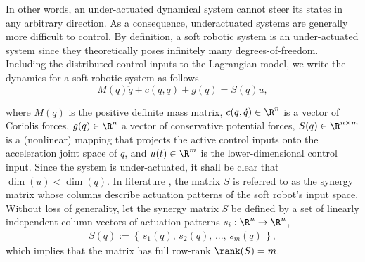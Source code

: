 \noindent In other words, an under-actuated dynamical system cannot steer its states in any arbitrary direction. As a consequence, underactuated systems are generally more difficult to control. By definition, a soft robotic system is an under-actuated system since they theoretically poses infinitely many degrees-of-freedom. Including the distributed control inputs to the Lagrangian model, we write the dynamics for a soft robotic system as follows
\begin{equation}
M(q)\ddot{q} + c(q,\dot{q}) + g(q)= S(q) u,
\end{equation}

\noindent where $M(q)$ is the positive definite mass matrix, $c(q,\dot{q})\in \R^{n}$ is a vector of Coriolis forces, $g(q)\in \R^{n}$ a vector of conservative potential forces, $S(q) \in \R^{n\times m}$ is a (nonlinear) mapping that projects the active control inputs onto the acceleration joint space of ${q}$, and $u(t) \in \R^{m}$ is the lower-dimensional control input. Since the system is under-actuated, it shall be clear that $\dim(u) < \dim(q)$. In literature \cite{Santina2019}, the matrix $S$ is referred to as the synergy matrix whose columns describe actuation patterns of the soft robot's input space. Without loss of generality, let the synergy matrix $S$ be defined by a set of linearly independent column vectors of actuation patterns $s_i: \R^n \to \R^n$,
\begin{align}
S(q) := \left\{\,s_1(q),\,s_2(q),\,...,\,s_m(q)\,\right\}, 
\end{align}
which implies that the matrix has full row-rank $\rank(S) = m$. 

